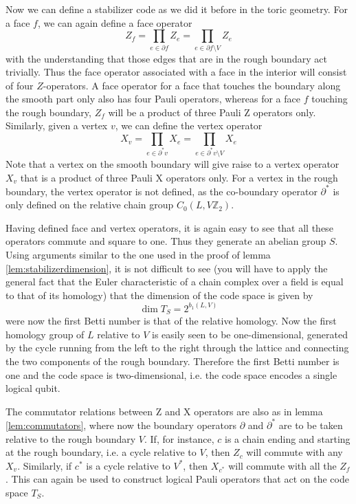 \documentclass[a4paper, draft]{article}
\theoremstyle{own}
\theoremstyle{remark}
\newcommand{\Z}{\mathbb{Z}}
\begin{document}
Now we can define a stabilizer code as we did it before in the toric geometry. For a face $f$, we can again define a face operator
$$
Z_f = \prod_{e \in \partial f} Z_e = \prod_{e \in \partial f \setminus V} Z_e
$$
with the understanding that those edges that are in the rough boundary act trivially. Thus the face operator associated with a face in the interior will consist of four $Z$-operators. A face operator for a face that touches the boundary along the smooth part only also has four Pauli operators, whereas for a face $f$ touching the rough boundary, $Z_f$ will be a product of three Pauli Z operators only. Similarly, given a vertex $v$, we can define the vertex operator
$$
X_v = \prod_{e \in \partial^* v} X_e = \prod_{e \in \partial^* v \setminus V} X_e
$$
Note that a vertex on the smooth boundary will give raise to a vertex operator $X_v$ that is a product of three Pauli X operators only. For a vertex in the rough boundary, the vertex operator is not defined, as the co-boundary operator $\partial^*$ is only defined on the relative chain group $C_0(L,V\Z_2)$. 

Having defined face and vertex operators, it is again easy to see that all these operators commute and square to one. Thus they generate an abelian group $S$. Using arguments similar to the one used in the proof of lemma \ref{lem:stabilizerdimension}, it is not difficult to see (you will have to apply the general fact that the Euler characteristic of a chain complex over a field is equal to that of its homology) that the dimension of the code space is given by 
$$
\dim T_S = 2^{b_1(L,V)}
$$
were now the first Betti number is that of the relative homology. Now the first homology group of $L$ relative to $V$ is easily seen to be one-dimensional, generated by the cycle running from the left to the right through the lattice and connecting the two components of the rough boundary. Therefore the first Betti number is one and the code space is two-dimensional, i.e. the code space encodes a single logical qubit.

The commutator relations between Z and X operators are also as in lemma \ref{lem:commutators}, where now the boundary operators $\partial$ and $\partial^*$ are to be taken relative to the rough boundary $V$. If, for instance, $c$ is a chain ending and starting at the rough boundary, i.e. a cycle relative to $V$, then $Z_c$ will commute with any $X_v$. Similarly, if $c^*$ is a cycle relative to $V^*$, then $X_{c^*}$ will commute with all the $Z_f$. This can again be used to construct logical Pauli operators that act on the code space $T_S$. 
\end{document}
